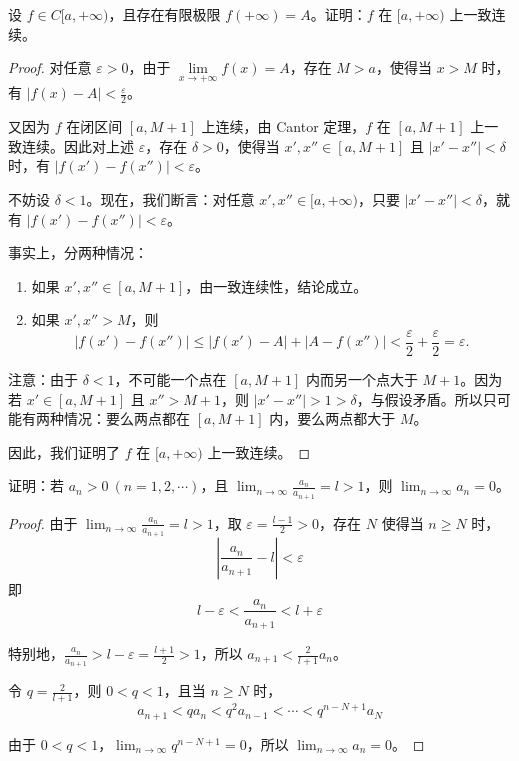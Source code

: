 \documentclass[lang=cn,12pt]{elegantbook}
\begin{document}
\begin{example}
    设 \( f \in C[a,+\infty) \)，且存在有限极限 \( f(+\infty)=A \)。证明：\( f \) 在 \([a,+\infty)\) 上一致连续。
    \end{example}
    
    \begin{proof}
    对任意 \(\varepsilon > 0\)，由于 \(\lim\limits_{x \to +\infty} f(x) = A\)，存在 \( M > a \)，使得当 \( x > M \) 时，有 \( |f(x)-A| < \frac{\varepsilon}{2} \)。
    
    又因为 \( f \) 在闭区间 \([a, M+1]\) 上连续，由 Cantor 定理，\( f \) 在 \([a, M+1]\) 上一致连续。因此对上述 \(\varepsilon\)，存在 \(\delta > 0\)，使得当 \( x', x'' \in [a, M+1] \) 且 \( |x'-x''| < \delta \) 时，有 \( |f(x') - f(x'')| < \varepsilon \)。
    
    不妨设 \(\delta < 1\)。现在，我们断言：对任意 \( x', x'' \in [a, +\infty) \)，只要 \( |x'-x''| < \delta \)，就有 \( |f(x') - f(x'')| < \varepsilon \)。
    
    事实上，分两种情况：
    \begin{enumerate}
        \item 如果 \( x', x'' \in [a, M+1] \)，由一致连续性，结论成立。
        \item 如果 \( x', x'' > M \)，则
        \[ 
        |f(x') - f(x'')| \leq |f(x') - A| + |A - f(x'')| < \frac{\varepsilon}{2} + \frac{\varepsilon}{2} = \varepsilon.
        \]
    \end{enumerate}
    注意：由于 \(\delta < 1\)，不可能一个点在 \([a, M+1]\) 内而另一个点大于 \(M+1\)。因为若 \(x' \in [a, M+1]\) 且 \(x'' > M+1\)，则 \( |x'-x''| > 1 > \delta \)，与假设矛盾。所以只可能有两种情况：要么两点都在 \([a, M+1]\) 内，要么两点都大于 \(M\)。
    
    因此，我们证明了 \(f\) 在 \([a, +\infty)\) 上一致连续。
    \end{proof}

\begin{example}
证明：若 $a_n > 0 \ (n=1,2,\cdots)$，且 $\lim_{n \to \infty} \frac{a_n}{a_{n+1}} = l > 1$，则 $\lim_{n \to \infty} a_n = 0$。
\end{example}

\begin{proof}
由于 $\lim_{n \to \infty} \frac{a_n}{a_{n+1}} = l > 1$，取 $\varepsilon = \frac{l-1}{2} > 0$，存在 $N$ 使得当 $n \geq N$ 时，
\[
\left|\frac{a_n}{a_{n+1}} - l\right| < \varepsilon
\]
即
\[
l - \varepsilon < \frac{a_n}{a_{n+1}} < l + \varepsilon
\]

特别地，$\frac{a_n}{a_{n+1}} > l - \varepsilon = \frac{l+1}{2} > 1$，所以 $a_{n+1} < \frac{2}{l+1} a_n$。

令 $q = \frac{2}{l+1}$，则 $0 < q < 1$，且当 $n \geq N$ 时，
\[
a_{n+1} < q a_n < q^2 a_{n-1} < \cdots < q^{n-N+1} a_N
\]

由于 $0 < q < 1$，$\lim_{n \to \infty} q^{n-N+1} = 0$，所以 $\lim_{n \to \infty} a_n = 0$。
\end{proof}
\end{document}
